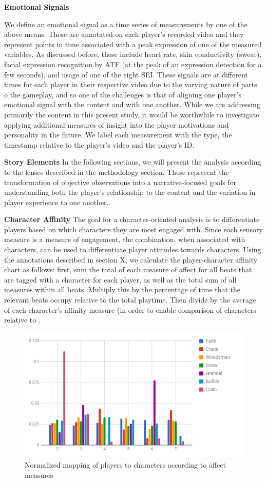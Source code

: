 \textbf{Emotional Signals}

We define an emotional signal as a time series of measurements by one
of the above means. These are annotated on each player's recorded
video and they represent points in time associated with a peak
expression of one of the measured variables. As discussed before,
these include heart rate, skin conductivity (sweat), facial expression
recognition by ATF (at the peak of an expression detection for a few
seconds), and usage of one of the eight SEI. These signals are at
different times for each player in their respective video due to the
varying nature of parts o the gameplay, and so one of the challenges
is that of aligning one player's emotional signal with the content and
with one another. While we are addressing primarily the content in
this present study, it would be worthwhile to investigate applying
additional measures of insight into the player motivations and
personality in the future. We label each measurement with the type,
the timestamp relative to the player's video and the player's ID.

\textbf{Story Elements}
In the following sections, we will present the analysis according to
the lenses described in the methodology section. These represent the
transformation of objective observations into a narrative-focused
goals for understanding both the player's relationship to the content
and the variation in player experience to one another..

\textbf{Character Affinity}
The goal for a character-oriented analysis is to differentiate players
based on which characters they are most engaged with. Since each
sensory measure is a measure of engagement, the combination, when
associated with characters, can be used to differentiate player
attitudes towards characters. Using the annotations described in
section X, we calculate the player-character affinity chart as
follows: first, sum the total of each measure of affect for all beats
that are tagged with a character for each player, as well as the total
sum of all measures within all beats. Multiply this by the percentage
of time that the relevant beats occupy relative to the total
playtime. Then divide by the average of each character's affinity
measure (in order to enable comparison of characters relative to .

\begin{figure}[htbp]
\centering
\includegraphics[width=.9\linewidth]{figures/fig3.PNG}
\caption{\label{fig:orge5e1992}
Normalized mapping of players to characters according to affect measures}
\end{figure}


